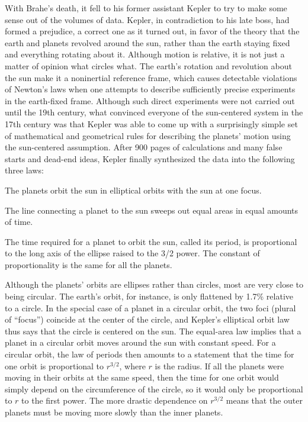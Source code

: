 With Brahe's death, it fell to his former assistant Kepler
to try to make some sense out of the volumes of data.
Kepler, in contradiction to his late boss, had formed a
prejudice, a correct one as it turned out, in favor of the
theory that the earth and planets revolved around the sun,
rather than the earth staying fixed and everything rotating
about it. Although motion is relative, it is not just a
matter of opinion what circles what. The earth's rotation
and revolution about the sun make it a noninertial reference
frame, which causes detectable violations of Newton's laws
when one attempts to describe sufficiently precise
experiments in the earth-fixed frame. Although such direct
experiments were not carried out until the 19th century,
what convinced everyone of the sun-centered system in the
17th century was that Kepler was able to come up with a
surprisingly simple set of mathematical and geometrical
rules for describing the planets' motion using the
sun-centered assumption. After 900 pages of calculations and
many false starts and dead-end ideas, Kepler finally
synthesized the data into the following three laws:


\begin{lessimportant}
The planets orbit the sun in
elliptical orbits with the sun at one focus.
\end{lessimportant}

\begin{lessimportant}
The line connecting a planet to the sun sweeps out equal
areas in equal amounts of time.
\end{lessimportant}

\begin{lessimportant}
The time required for a planet to orbit the sun, called its
period, is proportional to the long axis of the ellipse
raised to the 3/2 power. The constant of proportionality is
the same for all the planets.
\end{lessimportant}

Although the planets' orbits are ellipses rather than
circles, most are very close to being circular.  The earth's
orbit, for instance, is only flattened by 1.7\% relative to
a circle.  In the special case of a planet in a circular
orbit, the two foci (plural of ``focus'') coincide at the
center of the circle, and Kepler's elliptical orbit law thus
says that the circle is centered on the sun. The equal-area
law implies that a planet in a circular orbit moves around
the sun with constant speed.  For a circular orbit, the law
of periods then amounts to a statement that the time for one
orbit is proportional to $r^{3/2}$, where $r$ is the radius. If
all the planets were moving in their orbits at the same
speed, then the time for one orbit would simply depend on
the circumference of the circle, so it would only be
proportional to $r$ to the first power. The more drastic
dependence on $r^{3/2}$ means that the outer planets must be
moving more slowly than the inner planets.

